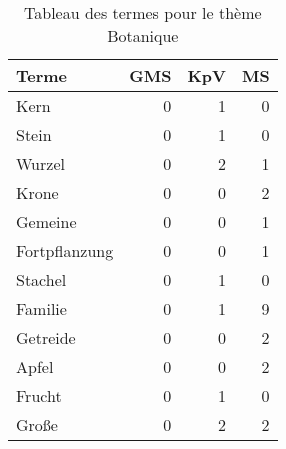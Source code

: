 
\begin{table}[ht]
\centering
\caption{Tableau des termes pour le thème Botanique}
\label{tab:Botanique}
\begin{tabular}{lrrr}
\hline
 Terme         &   GMS &   KpV &   MS \\
\hline
 Kern          &     0 &     1 &    0 \\
 Stein         &     0 &     1 &    0 \\
 Wurzel        &     0 &     2 &    1 \\
 Krone         &     0 &     0 &    2 \\
 Gemeine       &     0 &     0 &    1 \\
 Fortpflanzung &     0 &     0 &    1 \\
 Stachel       &     0 &     1 &    0 \\
 Familie       &     0 &     1 &    9 \\
 Getreide      &     0 &     0 &    2 \\
 Apfel         &     0 &     0 &    2 \\
 Frucht        &     0 &     1 &    0 \\
 Große         &     0 &     2 &    2 \\
\hline
\end{tabular}
\end{table}
    